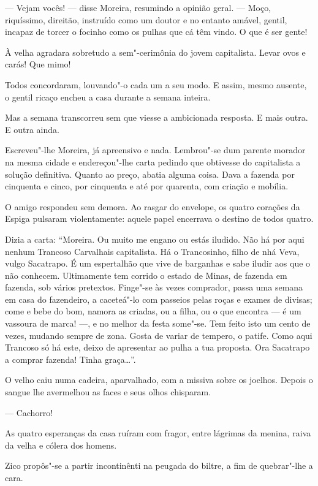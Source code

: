 --- Vejam vocês! --- disse Moreira, resumindo a opinião geral. --- Moço,
riquíssimo, direitão, instruído como um doutor e no entanto amável,
gentil, incapaz de torcer o focinho como os pulhas que cá têm vindo. O
que é ser gente!

À velha agradara sobretudo a sem"-cerimônia do jovem capitalista. Levar
ovos e carás! Que mimo!

Todos concordaram, louvando"-o cada um a seu modo. E assim, mesmo
ausente, o gentil ricaço encheu a casa durante a semana inteira.

Mas a semana transcorreu sem que viesse a ambicionada resposta. E mais
outra. E outra ainda.

Escreveu"-lhe Moreira, já apreensivo e nada. Lembrou"-se dum parente
morador na mesma cidade e endereçou"-lhe carta pedindo que obtivesse do
capitalista a solução definitiva. Quanto ao preço, abatia alguma coisa.
Dava a fazenda por cinquenta e cinco, por cinquenta e até por quarenta,
com criação e mobília.

O amigo respondeu sem demora. Ao rasgar do envelope, os quatro corações
da Espiga pulsaram violentamente: aquele papel encerrava o destino de
todos quatro.

Dizia a carta: ``Moreira. Ou muito me engano ou estás iludido. Não há
por aqui nenhum Trancoso Carvalhais capitalista. Há o Trancosinho, filho
de nhá Veva, vulgo Sacatrapo. É um espertalhão que vive de barganhas e
sabe iludir aos que o não conhecem. Ultimamente tem corrido o estado de
Minas, de fazenda em fazenda, sob vários pretextos. Finge"-se às vezes
comprador, passa uma semana em casa do fazendeiro, a caceteá"-lo com
passeios pelas roças e exames de divisas; come e bebe do bom, namora as
criadas, ou a filha, ou o que encontra --- é um vassoura de marca! ---,
e no melhor da festa some"-se. Tem feito isto um cento de vezes, mudando
sempre de zona. Gosta de variar de tempero, o patife. Como aqui Trancoso
só há este, deixo de apresentar ao pulha a tua proposta. Ora Sacatrapo a
comprar fazenda! Tinha graça\ldots{}''.

O velho caiu numa cadeira, aparvalhado, com a missiva sobre os joelhos.
Depois o sangue lhe avermelhou as faces e seus olhos chisparam.

--- Cachorro!

As quatro esperanças da casa ruíram com fragor, entre lágrimas da
menina, raiva da velha e cólera dos homens.

Zico propôs"-se a partir incontinênti na peugada do biltre, a fim de
quebrar"-lhe a cara.

